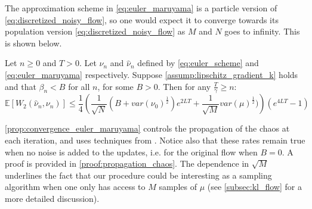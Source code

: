 The approximation scheme in \cref{eq:euler_maruyama} is a particle version of \cref{eq:discretized_noisy_flow}, so one would expect it to converge towards its population version  \cref{eq:discretized_noisy_flow} as $M$ and $N$ goes to infinity. This is shown below.
\begin{theorem}\label{prop:convergence_euler_maruyama}
 Let $n\ge 0$ and $T>0$. Let $\nu_n$ and $\hat{\nu}_n$ defined by \cref{eq:euler_scheme} and \cref{eq:euler_maruyama} respectively. Suppose \cref{assump:lipschitz_gradient_k} holds and that $\beta_n<B$ for all $n$, for some $B>0$. Then for any $\frac{T}{\gamma}\geq n$:
\[
\mathbb{E}[W_{2}(\hat{\nu}_{n},\nu_{n})]\leq \frac{1}{4}\left(\frac{1}{\sqrt{N}}(B+var(\nu_{0})^{\frac{1}{2}})e^{2LT}+\frac{1}{\sqrt{M}}var(\mu)^{\frac{1}{2}})\right)(e^{4LT}-1)
\]
\end{theorem}
\cref{prop:convergence_euler_maruyama} controls the propagation of the chaos at each iteration, and uses techniques from \cite{jourdain2007nonlinear}. Notice also that these rates remain true when no noise is added to the updates, i.e. for the original flow when $B=0$. A proof is provided in \cref{proof:propagation_chaos}. The dependence in $\sqrt{M}$ underlines the fact that our procedure could be interesting as a sampling algorithm when one only has access to $M$ samples of $\mu$ (see \cref{subsec:kl_flow} for a more detailed discussion).


